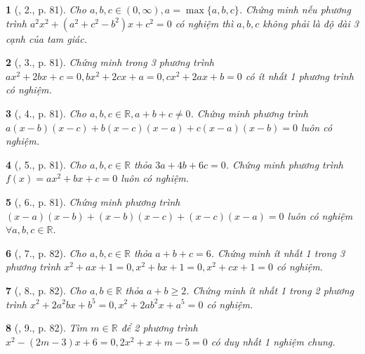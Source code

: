 \documentclass{article}
\newtheorem{baitoan}{}
\begin{document}
\begin{baitoan}[\cite{Thu_Viet_Minh_ptb2}, 2., p. 81]
	Cho $a,b,c\in(0,\infty),a = \max\{a,b,c\}$. Chứng minh nếu phương trình $a^2x^2 + (a^2 + c^2 - b^2)x + c^2 = 0$ có nghiệm thì $a,b,c$ không phải là độ dài 3 cạnh của tam giác.
\end{baitoan}

\begin{baitoan}[\cite{Thu_Viet_Minh_ptb2}, 3., p. 81]
	Chứng minh trong 3 phương trình $ax^2 + 2bx + c = 0,bx^2 + 2cx + a = 0,cx^2 + 2ax + b = 0$ có ít nhất 1 phương trình có nghiệm.
\end{baitoan}

\begin{baitoan}[\cite{Thu_Viet_Minh_ptb2}, 4., p. 81]
	Cho $a,b,c\in\mathbb{R},a + b + c\ne0$. Chứng minh phương trình $a(x - b)(x - c) + b(x - c)(x - a) + c(x - a)(x - b) = 0$ luôn có nghiệm.
\end{baitoan}

\begin{baitoan}[\cite{Thu_Viet_Minh_ptb2}, 5., p. 81]
	Cho $a,b,c\in\mathbb{R}$ thỏa $3a + 4b + 6c = 0$. Chứng minh phương trình $f(x) = ax^2 + bx + c = 0$ luôn có nghiệm.
\end{baitoan}

\begin{baitoan}[\cite{Thu_Viet_Minh_ptb2}, 6., p. 81]
	Chứng minh phương trình $(x - a)(x - b) + (x - b)(x - c) + (x - c)(x - a) = 0$ luôn có nghiệm $\forall a,b,c\in\mathbb{R}$.
\end{baitoan}

\begin{baitoan}[\cite{Thu_Viet_Minh_ptb2}, 7., p. 82]
	Cho $a,b,c\in\mathbb{R}$ thỏa $a + b + c = 6$. Chứng minh ít nhất 1 trong 3 phương trình $x^2 + ax + 1 = 0,x^2 + bx + 1 = 0,x^2 + cx + 1 = 0$ có nghiệm.
\end{baitoan}

\begin{baitoan}[\cite{Thu_Viet_Minh_ptb2}, 8., p. 82]
	Cho $a,b\in\mathbb{R}$ thỏa $a + b\ge2$. Chứng minh ít nhất 1 trong 2 phương trình $x^2 + 2a^2bx + b^5 = 0,x^2 + 2ab^2x + a^5 = 0$ có nghiệm.
\end{baitoan}

\begin{baitoan}[\cite{Thu_Viet_Minh_ptb2}, 9., p. 82]
	Tìm $m\in\mathbb{R}$ để 2 phương trình $x^2 - (2m - 3)x + 6 = 0,2x^2 + x + m - 5 = 0$ có duy nhất 1 nghiệm chung.
\end{baitoan}
\end{document}
